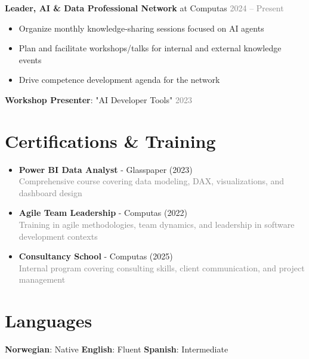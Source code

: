 \documentclass[11pt,a4paper]{article}
\begin{document}
\textbf{Leader, AI \& Data Professional Network} at Computas \hfill \textcolor{gray}{2024 – Present}
\begin{itemize}[itemsep=0.3em, leftmargin=*]
\item Organize monthly knowledge-sharing sessions focused on AI agents
\item Plan and facilitate workshops/talks for internal and external knowledge events
\item Drive competence development agenda for the network
\end{itemize}

\textbf{Workshop Presenter}: "AI Developer Tools" \hfill \textcolor{gray}{2023}

\vspace{10pt}

\section{Certifications \& Training}

\begin{itemize}[itemsep=0.5em, leftmargin=*]
\item \textbf{Power BI Data Analyst} - Glasspaper (2023)\\
\textcolor{gray}{Comprehensive course covering data modeling, DAX, visualizations, and dashboard design}
\item \textbf{Agile Team Leadership} - Computas (2022)\\
\textcolor{gray}{Training in agile methodologies, team dynamics, and leadership in software development contexts}
\item \textbf{Consultancy School} - Computas (2025)\\
\textcolor{gray}{Internal program covering consulting skills, client communication, and project management}
\end{itemize}

\vspace{10pt}

\section{Languages}
\textbf{Norwegian}: Native \quad \textbf{English}: Fluent \quad \textbf{Spanish}: Intermediate
\end{document}
